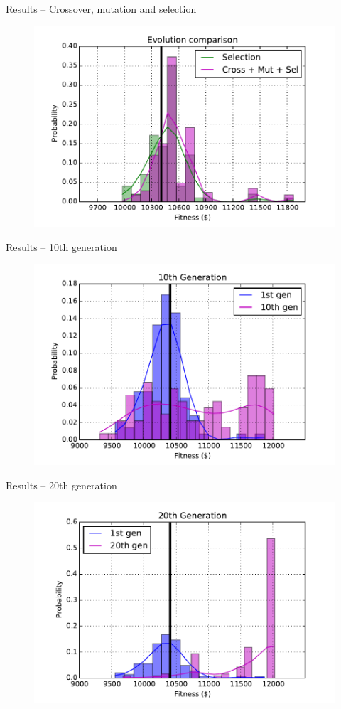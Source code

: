 \documentclass[12pt,portuguese]{beamer}
\begin{document}
\begin{frame}{Results -- Crossover, mutation and selection}
	\begin{figure}[h]
	\centering
	\includegraphics[width=0.9\columnwidth]{images/01l_100_cr_mut_sel.pdf}
	\end{figure}
\end{frame}

\begin{frame}{Results -- 10th generation}
	\begin{figure}[h]
	\centering
	\includegraphics[width=0.9\columnwidth]{images/10l_100.pdf}
	\end{figure}
\end{frame}

\begin{frame}{Results -- 20th generation}
	\begin{figure}[h]
	\centering
	\includegraphics[width=0.9\columnwidth]{images/20l_100.pdf}
	\end{figure}
\end{frame}
\end{document}
